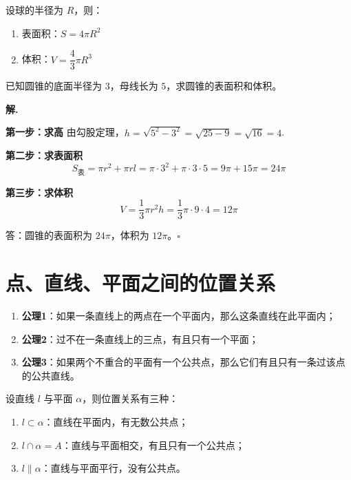 \begin{theorem}[球的表面积与体积]
设球的半径为 $R$，则：
\begin{enumerate}
    \item 表面积：$S = 4\pi R^2$
    \item 体积：$V = \dfrac{4}{3}\pi R^3$
\end{enumerate}
\end{theorem}

\begin{example}
已知圆锥的底面半径为 $3$，母线长为 $5$，求圆锥的表面积和体积。
\end{example}

\textbf{解.}

\textbf{第一步：求高}
由勾股定理，$h = \sqrt{5^2 - 3^2} = \sqrt{25 - 9} = \sqrt{16} = 4$.

\textbf{第二步：求表面积}
\[ S_{\text{表}} = \pi r^2 + \pi rl = \pi \cdot 3^2 + \pi \cdot 3 \cdot 5 = 9\pi + 15\pi = 24\pi \]

\textbf{第三步：求体积}
\[ V = \frac{1}{3}\pi r^2 h = \frac{1}{3}\pi \cdot 9 \cdot 4 = 12\pi \]

答：圆锥的表面积为 $24\pi$，体积为 $12\pi$。\hfill $\square$

\section{点、直线、平面之间的位置关系}

\begin{definition}[平面的基本性质]
\begin{enumerate}
    \item \textbf{公理1}：如果一条直线上的两点在一个平面内，那么这条直线在此平面内；
    \item \textbf{公理2}：过不在一条直线上的三点，有且只有一个平面；
    \item \textbf{公理3}：如果两个不重合的平面有一个公共点，那么它们有且只有一条过该点的公共直线。
\end{enumerate}
\end{definition}

\begin{theorem}[直线与平面的位置关系]
设直线 $l$ 与平面 $\alpha$，则位置关系有三种：
\begin{enumerate}
    \item $l \subset \alpha$：直线在平面内，有无数公共点；
    \item $l \cap \alpha = A$：直线与平面相交，有且只有一个公共点；
    \item $l \parallel \alpha$：直线与平面平行，没有公共点。
\end{enumerate}
\end{theorem}

